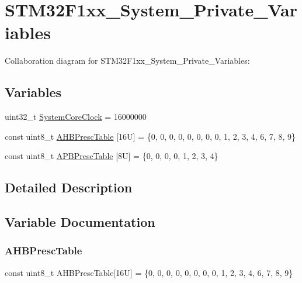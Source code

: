 \hypertarget{group__STM32F1xx__System__Private__Variables}{}\section{S\+T\+M32\+F1xx\+\_\+\+System\+\_\+\+Private\+\_\+\+Variables}
\label{group__STM32F1xx__System__Private__Variables}
Collaboration diagram for S\+T\+M32\+F1xx\+\_\+\+System\+\_\+\+Private\+\_\+\+Variables\+:
\subsection*{Variables}
\begin{DoxyCompactItemize}
\item 
uint32\+\_\+t \hyperlink{group__STM32F1xx__System__Private__Variables_gaa3cd3e43291e81e795d642b79b6088e6}{System\+Core\+Clock} = 16000000
\item 
const uint8\+\_\+t \hyperlink{group__STM32F1xx__System__Private__Variables_ga53cb26d01524d9560f98101a2c597c40}{A\+H\+B\+Presc\+Table} \mbox{[}16\+U\mbox{]} = \{0, 0, 0, 0, 0, 0, 0, 0, 1, 2, 3, 4, 6, 7, 8, 9\}
\item 
const uint8\+\_\+t \hyperlink{group__STM32F1xx__System__Private__Variables_gaa93c123312c9273c0928a79f1203f759}{A\+P\+B\+Presc\+Table} \mbox{[}8\+U\mbox{]} = \{0, 0, 0, 0, 1, 2, 3, 4\}
\end{DoxyCompactItemize}


\subsection{Detailed Description}


\subsection{Variable Documentation}
\mbox{\label{group__STM32F1xx__System__Private__Variables_ga53cb26d01524d9560f98101a2c597c40}} 
\subsubsection{\texorpdfstring{A\+H\+B\+Presc\+Table}{AHBPrescTable}}
{\footnotesize\ttfamily const uint8\+\_\+t A\+H\+B\+Presc\+Table\mbox{[}16\+U\mbox{]} = \{0, 0, 0, 0, 0, 0, 0, 0, 1, 2, 3, 4, 6, 7, 8, 9\}}

